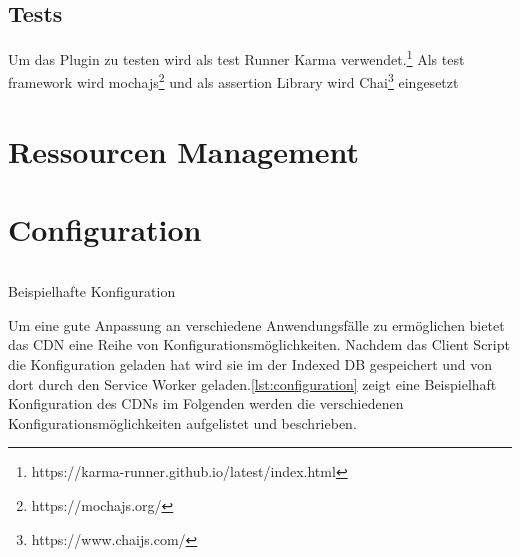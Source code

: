 \subsection{Tests}
Um das Plugin zu testen wird als test Runner Karma verwendet.\footnote{https://karma-runner.github.io/latest/index.html} Als test framework wird mochajs\footnote{https://mochajs.org/} und als assertion Library wird Chai\footnote{https://www.chaijs.com/} eingesetzt 


\section{Ressourcen Management}



\section{Configuration}
\begin{listing}[h]
	\inputminted{javascript}{listings/configuration.js}
	\caption{Beispielhafte Konfiguration}
	\label{lst:configuration}
\end{listing}

Um eine gute Anpassung an verschiedene Anwendungsfälle zu ermöglichen bietet das \pTp CDN eine Reihe von Konfigurationsmöglichkeiten. Nachdem das Client Script die Konfiguration geladen hat wird sie im der Indexed DB gespeichert und von dort durch den Service Worker geladen.\ref{lst:configuration} zeigt eine Beispielhaft Konfiguration des CDNs im Folgenden werden die verschiedenen Konfigurationsmöglichkeiten aufgelistet und beschrieben.

